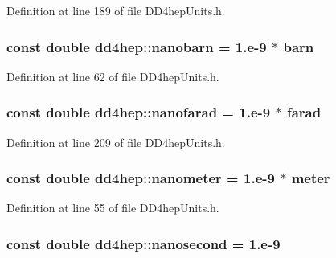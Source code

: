 Definition at line 189 of file DD4hepUnits.h.\hypertarget{namespacedd4hep_a7a705d86fd74fe189400eed71a94fc0c}{
\subsubsection[{nanobarn}]{\setlength{\rightskip}{0pt plus 5cm}const double {\bf dd4hep::nanobarn} = 1.e-\/9 $\ast$ {\bf barn}}}
\label{namespacedd4hep_a7a705d86fd74fe189400eed71a94fc0c}


Definition at line 62 of file DD4hepUnits.h.\hypertarget{namespacedd4hep_aa28fb5121932b99b25e9601baaac3545}{
\subsubsection[{nanofarad}]{\setlength{\rightskip}{0pt plus 5cm}const double {\bf dd4hep::nanofarad} = 1.e-\/9 $\ast$ {\bf farad}}}
\label{namespacedd4hep_aa28fb5121932b99b25e9601baaac3545}


Definition at line 209 of file DD4hepUnits.h.\hypertarget{namespacedd4hep_af784647fab76654e26b09a341d3f9210}{
\subsubsection[{nanometer}]{\setlength{\rightskip}{0pt plus 5cm}const double {\bf dd4hep::nanometer} = 1.e-\/9 $\ast$ {\bf meter}}}
\label{namespacedd4hep_af784647fab76654e26b09a341d3f9210}


Definition at line 55 of file DD4hepUnits.h.\hypertarget{namespacedd4hep_acd3d49e76b85c03111a8bdcaffe4c8c7}{
\subsubsection[{nanosecond}]{\setlength{\rightskip}{0pt plus 5cm}const double {\bf dd4hep::nanosecond} = 1.e-\/9}}
\label{namespacedd4hep_acd3d49e76b85c03111a8bdcaffe4c8c7}



